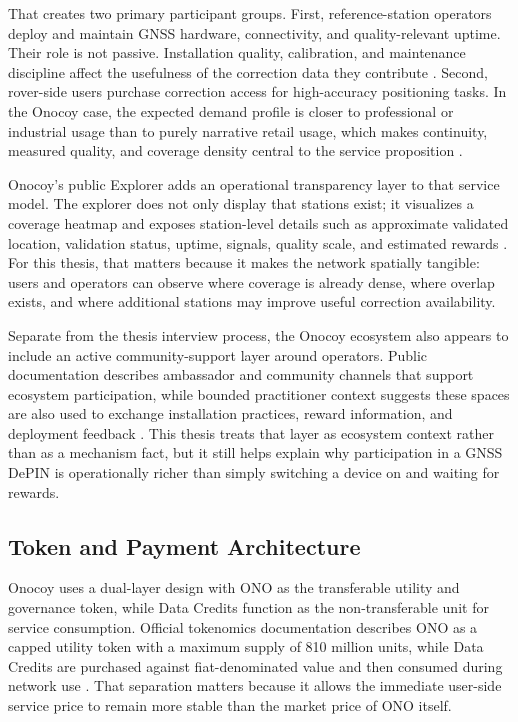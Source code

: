 That creates two primary participant groups. First, reference-station operators deploy and maintain GNSS hardware, connectivity, and quality-relevant uptime. Their role is not passive. Installation quality, calibration, and maintenance discipline affect the usefulness of the correction data they contribute \cite{OnocoyWhitepaper301, OnocoyRewards}. Second, rover-side users purchase correction access for high-accuracy positioning tasks. In the Onocoy case, the expected demand profile is closer to professional or industrial usage than to purely narrative retail usage, which makes continuity, measured quality, and coverage density central to the service proposition \cite{OnocoyWhitepaper301}.

Onocoy's public Explorer adds an operational transparency layer to that service model. The explorer does not only display that stations exist; it visualizes a coverage heatmap and exposes station-level details such as approximate validated location, validation status, uptime, signals, quality scale, and estimated rewards \cite{OnocoyExplorer}. For this thesis, that matters because it makes the network spatially tangible: users and operators can observe where coverage is already dense, where overlap exists, and where additional stations may improve useful correction availability.

Separate from the thesis interview process, the Onocoy ecosystem also appears to include an active community-support layer around operators. Public documentation describes ambassador and community channels that support ecosystem participation, while bounded practitioner context suggests these spaces are also used to exchange installation practices, reward information, and deployment feedback \cite{OnocoyAmbassador}. This thesis treats that layer as ecosystem context rather than as a mechanism fact, but it still helps explain why participation in a GNSS DePIN is operationally richer than simply switching a device on and waiting for rewards.

\subsection{Token and Payment Architecture}
Onocoy uses a dual-layer design with ONO as the transferable utility and governance token, while Data Credits function as the non-transferable unit for service consumption. Official tokenomics documentation describes ONO as a capped utility token with a maximum supply of 810 million units, while Data Credits are purchased against fiat-denominated value and then consumed during network use \cite{OnocoyWhitepaper301, OnocoyToken, OnocoyTokenomics}. That separation matters because it allows the immediate user-side service price to remain more stable than the market price of ONO itself.

